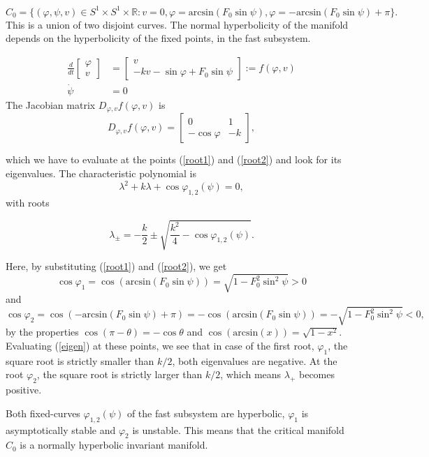 \begin{solution}[9.6]
$$
C_0 = \{ (\varphi, \psi, v) \in S^1 \times S^1 \times \mathbb{R} : v = 0, \varphi = \text{arcsin}(F_0 \sin \psi), \varphi = -\text{arcsin}(F_0 \sin \psi) + \pi
\}.
$$
This is a union of two disjoint curves. The normal hyperbolicity of the manifold depends on the hyperbolicity of the fixed points, in the fast subsystem. 

\begin{align*}
    \frac{d}{dt}\begin{bmatrix}
    \varphi \\
    v 
    \end{bmatrix} &= \begin{bmatrix} 
     v \\
    -k v - \sin \varphi + F_0 \sin \psi 
    \end{bmatrix} := f(\varphi, v) \\
    \dot{\psi} &= 0 
\end{align*}
The Jacobian matrix $D_{\varphi, v} f(\varphi,v)$ is
$$
D_{\varphi, v} f(\varphi,v) = \begin{bmatrix} 
0 & 1 \\
-\cos \varphi & -k
\end{bmatrix},
$$

which we have to evaluate at the points (\ref{root1}) and (\ref{root2}) and look for its eigenvalues. The characteristic polynomial is 
$$
\lambda^2  + k \lambda + \cos \varphi_{1,2}(\psi) = 0,
$$
with roots

\begin{equation}
\label{eigen}
    \lambda_{\pm} =  -\frac{k}{2} \pm \sqrt{\frac{k^2}{4} - \cos \varphi_{1,2}(\psi)}.
\end{equation}

Here, by substituting (\ref{root1}) and (\ref{root2}), we get
$$
\cos \varphi_1 = \cos (\text{arcsin}(F_0\sin \psi) ) = \sqrt{1 - F_0^2 \sin^2 \psi} >0
$$
and
$$
\cos \varphi_2 = \cos (-\text{arcsin}(F_0\sin \psi)+\pi) = -\cos( \text{arcsin}(F_0\sin \psi)) = - \sqrt{1 - F_0^2 \sin^2 \psi} <0,
$$
by the properties $\cos(\pi - \theta) = - \cos \theta$ and $\cos(\text{arcsin}(x)) = \sqrt{1-x^2}$.
Evaluating (\ref{eigen}) at these points, we see that in case of the first root, $\varphi_1$, the square root is strictly smaller than $k/2$, both eigenvalues are negative.
At the root $\varphi_2$, the square root is strictly larger than $k/2$, which means $\lambda_+$ becomes positive. 

Both fixed-curves $\varphi_{1,2}(\psi)$ of the fast subsystem are hyperbolic, $\varphi_1$ is asymptotically stable and $\varphi_2$ is unstable. This means that the critical manifold $C_0$ is a normally hyperbolic invariant manifold. 


\end{solution}
